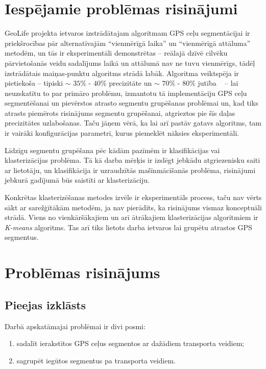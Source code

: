 \documentclass{ludis}
\begin{document}
\chapter{Iespējamie problēmas risinājumi}
GeoLife projekta ietvaros izstrādātajam algoritmam GPS ceļu segmentācijai ir priekšrocības 
pār alternatīvajām ``vienmērīgā laika'' un ``vienmērīgā attāluma'' metodēm, un tās ir
ekspe\-rimentāli demonstrētas -- reālajā dzīvē cilvēku pārvietošanās veidu sadalījums laikā 
un attālumā nav ne tuvu vienmērīgs, tādēļ izstrādātais maiņas-punktu algoritms strādā labāk.
Algoritma veiktspēja ir pietiekoša -- tipiski $\sim$ $35\%$ - $40\%$
precizitāte un $\sim$ $70\%$ - $80\%$ jutība ~\cite{zheng_gps_segmentation} -- 
lai neuzskatītu to par primāro problēmu, izmantotu tā implementāciju GPS ceļu segmentēšanai 
un pievērstos atrasto segmentu grupēšanas problēmai un, kad tiks atrasts piemērots risinājums
segmentu grupēšanai, atgrieztos pie šīs daļas precizitātes uzlabošanas. Taču jāņem vērā, ka lai
arī pastāv gatavs algoritms, tam ir vairāki konfigurācijas parametri, kurus piemeklēt nāksies
eksperimentāli.

Līdzīgu segmentu grupēšana pēc kādām pazīmēm ir klasifikācijas vai klasterizācijas \linebreak 
problēma. Tā kā darba mērķis ir izslēgt jebkādu atgriezenisku saiti ar lietotāju, un klasifikācija 
ir uzraudzītās mašīnmācīšanās problēma, risinājumi jebkurā gadījumā būs saistīti 
ar \linebreak klasterizāciju.

Konkrētas klasterizēšanas metodes izvēle ir eksperimentāls process, taču nav vērts sākt ar 
sarežģītākām metodēm, ja nav pierādīts, ka risinājums vismaz konceptuāli strādā. Viens
no vienkāršākajiem un arī ātrākajiem klasterizācijas algoritmiem ir \emph{K-means} algoritms.
Tas arī tiks lietots darba ietvaros lai grupētu atrastos GPS segmentus.

\chapter{Problēmas risinājums}
\section{Pieejas izklāsts}
Darbā apskatāmajai problēmai ir divi posmi:
\begin{enumerate}
\item sadalīt ierakstītos GPS ceļus segmentos ar dažādiem transporta veidiem;
\item sagrupēt iegūtos segmentus pa transporta veidiem.
\end{enumerate}
\end{document}

